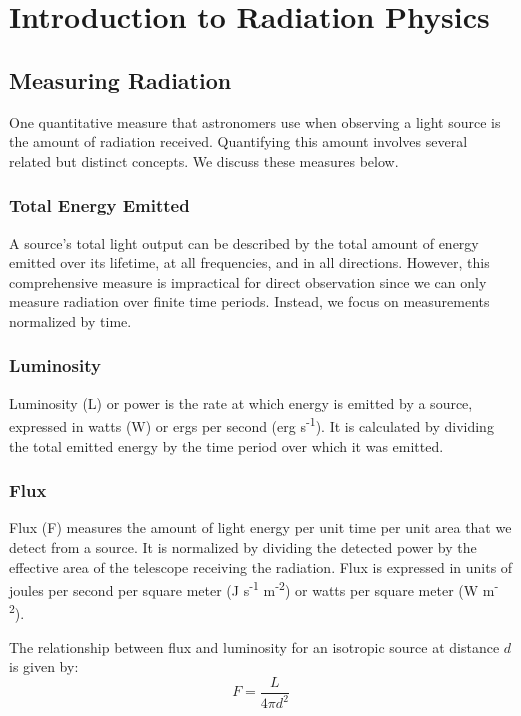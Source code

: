 \chapter{Introduction to Radiation Physics}

\section{Measuring Radiation}

One quantitative measure that astronomers use when observing a light source is the amount of radiation received. Quantifying this amount involves several related but distinct concepts. We discuss these measures below.

\subsection{Total Energy Emitted}

A source's total light output can be described by the total amount of energy emitted over its lifetime, at all frequencies, and in all directions. However, this comprehensive measure is impractical for direct observation since we can only measure radiation over finite time periods. Instead, we focus on measurements normalized by time.

\subsection{Luminosity}

Luminosity (L) or power is the rate at which energy is emitted by a source, expressed in watts (W) or ergs per second (erg s\textsuperscript{-1}). It is calculated by dividing the total emitted energy by the time period over which it was emitted.

\subsection{Flux}

Flux (F) measures the amount of light energy per unit time per unit area that we detect from a source. It is normalized by dividing the detected power by the effective area of the telescope receiving the radiation. Flux is expressed in units of joules per second per square meter (J s\textsuperscript{-1} m\textsuperscript{-2}) or watts per square meter (W m\textsuperscript{-2}).

The relationship between flux and luminosity for an isotropic source at distance \( d \) is given by:
\[ F = \frac{L}{4 \pi d^2} \]

